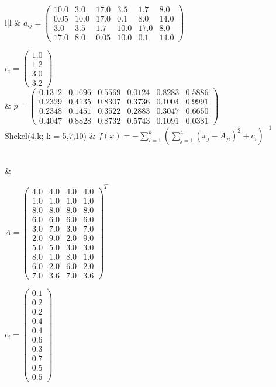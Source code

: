 \documentclass[fontsize=12, a4aper]{scrartcl}
\newcommand\Tstrut{\rule{0pt}{3ex}}           %
\begin{document}
\begin{table}[H]
\begin{tabularx}{\textwidth}{l|l}
			& \(a_{ij} = \begin{pmatrix}
			10.0 & 3.0 & 17.0 & 3.5 & 1.7 & 8.0\\
			0.05 & 10.0 & 17.0 & 0.1 & 8.0 & 14.0\\
			3.0 & 3.5 & 1.7 & 10.0 & 17.0 & 8.0\\
			17.0 & 8.0 & 0.05 & 10.0 & 0.1 & 14.0
			\end{pmatrix}\)
			
			\(c_i =	\begin{pmatrix}
			1.0\\
			1.2\\
			3.0\\
			3.2
			\end{pmatrix}\)\\
			
			& \(p = 	\begin{pmatrix}
			0.1312 & 0.1696 & 0.5569 & 0.0124 & 0.8283 & 0.5886\\
			0.2329 & 0.4135 & 0.8307 & 0.3736 & 0.1004 & 0.9991\\
			0.2348 & 0.1451 & 0.3522 & 0.2883 & 0.3047 & 0.6650\\
			0.4047 & 0.8828 & 0.8732 & 0.5743 & 0.1091 & 0.0381
			\end{pmatrix}\)\\
			
			Shekel(4,k; k = 5,7,10) & \(f(x) = -\sum_{i=1}^{k}(\sum_{j=1}^{4} (x_j - A_{ji})^2 + c_i)^{-1}\)\Tstrut\\
			&
			
			\(A = 	\begin{pmatrix}
			4.0 & 4.0 & 4.0 & 4.0\\
			1.0 & 1.0 & 1.0 & 1.0\\
			8.0 & 8.0 & 8.0 & 8.0\\
			6.0 & 6.0 & 6.0 & 6.0\\
			3.0 & 7.0 & 3.0 & 7.0\\
			2.0 & 9.0 & 2.0 & 9.0\\
			5.0 & 5.0 & 3.0 & 3.0\\
			8.0 & 1.0 & 8.0 & 1.0\\
			6.0 & 2.0 & 6.0 & 2.0\\
			7.0 & 3.6 & 7.0 & 3.6
			\end{pmatrix}^T\)
			
			\(c_i =	\begin{pmatrix}
			0.1\\
			0.2\\
			0.2\\
			0.4\\
			0.4\\
			0.6\\
			0.3\\
			0.7\\
			0.5\\
			0.5
			\end{pmatrix}\)
			
		\end{tabularx}
		
	\end{table}
	
\end{document}
